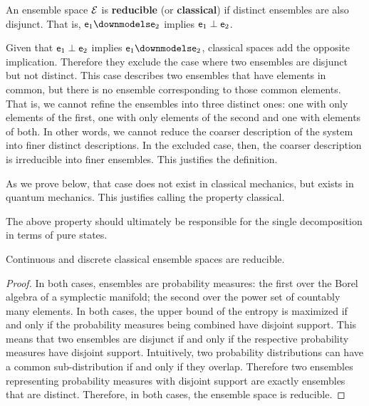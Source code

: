 \begin{defn}
	An ensemble space $\mathcal{E}$ is \textbf{reducible} (or \textbf{classical}) if distinct ensembles are also disjunct. That is, $\ens_1 \distinct \ens_2$ implies $\mathsf{e}_1 \perp \mathsf{e}_2$.
\end{defn}

\begin{justification}
	Given that $\mathsf{e}_1 \perp \mathsf{e}_2$ implies $\ens_1 \distinct \ens_2$, classical spaces add the opposite implication. Therefore they exclude the case where two ensembles are disjunct but not distinct. This case describes two ensembles that have elements in common, but there is no ensemble corresponding to those common elements. That is, we cannot refine the ensembles into three distinct ones: one with only elements of the first, one with only elements of the second and one with elements of both. In other words, we cannot reduce the coarser description of the system into finer distinct descriptions. In the excluded case, then, the coarser description is irreducible into finer ensembles. This justifies the definition.
	
	As we prove below, that case does not exist in classical mechanics, but exists in quantum mechanics. This justifies calling the property classical.
\end{justification}

\begin{remark}
	The above property should ultimately be responsible for the single decomposition in terms of pure states.
\end{remark}

\begin{prop}
	Continuous and discrete classical ensemble spaces are reducible.
\end{prop}

\begin{proof}
	In both cases, ensembles are probability measures: the first over the Borel algebra of a symplectic manifold; the second over the power set of countably many elements. In both cases, the upper bound of the entropy is maximized if and only if the probability measures being combined have disjoint support. This means that two ensembles are disjunct if and only if the respective probability measures have disjoint support. Intuitively, two probability distributions can have a common sub-distribution if and only if they overlap. Therefore two ensembles representing probability measures with disjoint support are exactly ensembles that are distinct. Therefore, in both cases, the ensemble space is reducible.
\end{proof}

